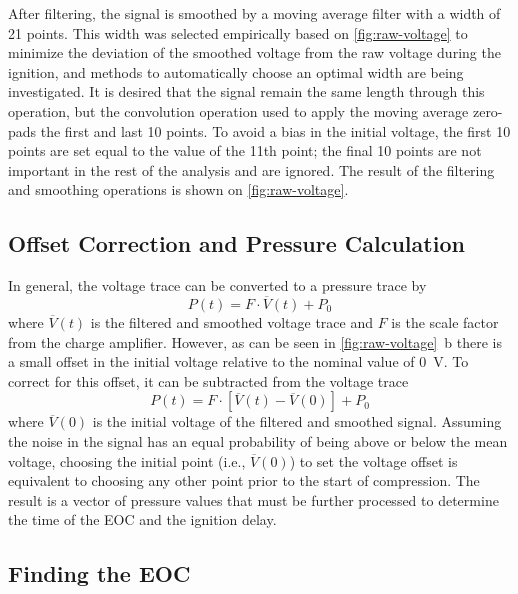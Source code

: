 \documentclass[12pt]{../ussci}
\begin{document}
After filtering, the signal is smoothed by a moving average filter with
a width of 21 points. This width was selected empirically based on
\cref{fig:raw-voltage} to minimize the deviation of the
smoothed voltage from the raw voltage during the ignition, and methods
to automatically choose an optimal width are being investigated. It is
desired that the signal remain the same length through this operation,
but the convolution operation used to apply the moving average zero-pads
the first and last 10 points. To avoid a bias in the initial voltage,
the first 10 points are set equal to the value of the 11th point; the
final 10 points are not important in the rest of the analysis and are
ignored. The result of the filtering and smoothing operations is shown
on \cref{fig:raw-voltage}.

\subsection{Offset Correction and Pressure Calculation}\label{offset-correction-and-pressure-calculation}

In general, the voltage trace can be converted to a pressure trace by
%
\begin{equation}
    P(t) = F \cdot \overline{V}(t) + P_0
\end{equation}
%
where \(\overline{V}(t)\) is the filtered and smoothed voltage trace and
\(F\) is the scale factor from the charge amplifier. However, as can be
seen in \cref{fig:raw-voltage}~b there is a small offset
in the initial voltage relative to the nominal value of \SI{0}{\V}. To correct
for this offset, it can be subtracted from the voltage trace
%
\begin{equation}
    P(t) = F \cdot \left[\overline{V}(t) - \overline{V}(0)\right] + P_0
\end{equation}
%
where \(\overline{V}(0)\) is the initial voltage of the filtered and
smoothed signal. Assuming the noise in the signal has an equal
probability of being above or below the mean voltage, choosing the
initial point (i.e., \(\overline{V}(0)\)) to set the voltage offset is
equivalent to choosing any other point prior to the start of
compression. The result is a vector of pressure values that must be
further processed to determine the time of the EOC and the ignition
delay.

\subsection{Finding the EOC}\label{finding-the-eoc}
\end{document}
